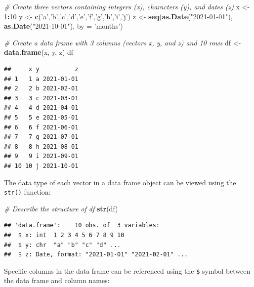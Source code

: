 \documentclass[]{book}
\newenvironment{Shaded}{\begin{snugshade}}{\end{snugshade}}
\newcommand{\CommentTok}[1]{\textcolor[rgb]{0.56,0.35,0.01}{\textit{#1}}}
\newcommand{\DataTypeTok}[1]{\textcolor[rgb]{0.13,0.29,0.53}{#1}}
\newcommand{\DecValTok}[1]{\textcolor[rgb]{0.00,0.00,0.81}{#1}}
\newcommand{\KeywordTok}[1]{\textcolor[rgb]{0.13,0.29,0.53}{\textbf{#1}}}
\newcommand{\NormalTok}[1]{#1}
\newcommand{\OperatorTok}[1]{\textcolor[rgb]{0.81,0.36,0.00}{\textbf{#1}}}
\newcommand{\StringTok}[1]{\textcolor[rgb]{0.31,0.60,0.02}{#1}}
\begin{document}
\begin{Shaded}
\begin{Highlighting}[]
\CommentTok{# Create three vectors containing integers (x), characters (y), and dates (z)}
\NormalTok{x <-}\StringTok{ }\DecValTok{1}\OperatorTok{:}\DecValTok{10}
\NormalTok{y <-}\StringTok{ }\KeywordTok{c}\NormalTok{(}\StringTok{'a'}\NormalTok{,}\StringTok{'b'}\NormalTok{,}\StringTok{'c'}\NormalTok{,}\StringTok{'d'}\NormalTok{,}\StringTok{'e'}\NormalTok{,}\StringTok{'f'}\NormalTok{,}\StringTok{'g'}\NormalTok{,}\StringTok{'h'}\NormalTok{,}\StringTok{'i'}\NormalTok{,}\StringTok{'j'}\NormalTok{)}
\NormalTok{z <-}\StringTok{ }\KeywordTok{seq}\NormalTok{(}\KeywordTok{as.Date}\NormalTok{(}\StringTok{"2021-01-01"}\NormalTok{), }\KeywordTok{as.Date}\NormalTok{(}\StringTok{"2021-10-01"}\NormalTok{), }\DataTypeTok{by =} \StringTok{'months'}\NormalTok{)}

\CommentTok{# Create a data frame with 3 columns (vectors x, y, and z) and 10 rows}
\NormalTok{df <-}\StringTok{ }\KeywordTok{data.frame}\NormalTok{(x, y, z)}
\NormalTok{df}
\end{Highlighting}
\end{Shaded}

\begin{verbatim}
##     x y          z
## 1   1 a 2021-01-01
## 2   2 b 2021-02-01
## 3   3 c 2021-03-01
## 4   4 d 2021-04-01
## 5   5 e 2021-05-01
## 6   6 f 2021-06-01
## 7   7 g 2021-07-01
## 8   8 h 2021-08-01
## 9   9 i 2021-09-01
## 10 10 j 2021-10-01
\end{verbatim}

The data type of each vector in a data frame object can be viewed using the \texttt{str()} function:

\begin{Shaded}
\begin{Highlighting}[]
\CommentTok{# Describe the structure of df}
\KeywordTok{str}\NormalTok{(df)}
\end{Highlighting}
\end{Shaded}

\begin{verbatim}
## 'data.frame':    10 obs. of  3 variables:
##  $ x: int  1 2 3 4 5 6 7 8 9 10
##  $ y: chr  "a" "b" "c" "d" ...
##  $ z: Date, format: "2021-01-01" "2021-02-01" ...
\end{verbatim}

Specific columns in the data frame can be referenced using the \texttt{\$} symbol between the data frame and column names:
\end{document}
